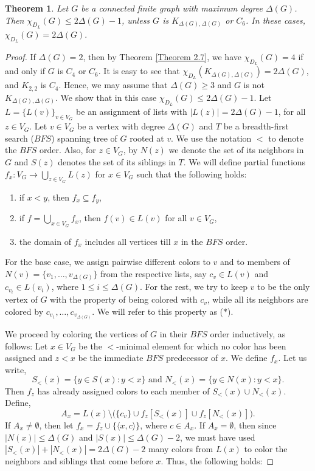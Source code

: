 \documentclass[12pt,reqno,a4paper]{amsart}
\theoremstyle{definition}
\newtheorem{thm}[defn]{Theorem}
\begin{document}
\begin{thm}\label{Theorem 3.1}
{\em Let $G$ be a connected finite graph with maximum degree $\Delta(G)$. Then $\chi_{D_{L}}(G)\leq 2\Delta(G)-1$, unless $G$ is  $K_{\Delta(G),\Delta(G)}$ or $C_6$. In these cases, $\chi_{D_{L}}(G) = 2\Delta(G)$}.    
\end{thm}

\begin{proof}
   If $\Delta(G)=2$, then by Theorem \ref{Theorem 2.7}, we have $\chi_{D_L}(G) = 4$ if and only if $G$ is $C_4$ or $C_6$. It is easy to see that $\chi_{D_L}(K_{\Delta(G),\Delta(G)}) = 2\Delta(G)$, and $K_{2,2}$ is $C_4$. Hence, we may assume that $\Delta(G) \geq 3$ and $G$ is not $K_{\Delta(G),\Delta(G)}$. We show that in this case $\chi_{D_L}(G) \leq 2\Delta(G)-1$. Let $L=\{L(v)\}_{v\in V_G}$ be an assignment of lists with $|L(z)| = 2\Delta(G)-1$, for all $z\in V_G$. 
   Let $v\in V_G$ be a vertex with degree $\Delta(G)$ and $T$ be a breadth-first search ($BFS$) spanning tree of $G$ rooted at $v$. We use the notation $<$ to denote the $BFS$ order. Also, for $z\in V_{G}$, by $N(z)$ we denote the set of its neighbors in $G$ and $S(z)$ denotes the set of its siblings in $T$. We will define partial functions $f_x: V_{G} \to \bigcup_{z\in V_{G}}L(z)$ for $x\in V_{G}$ such that the following holds: 
\begin{enumerate}
    \item[(i)] if $x < y$, then $f_x\subseteq f_y$,
    \item[(ii)] if $f=\bigcup_{x\in V_{G}} f_x$, then $f(v)\in L(v)$ for all $v\in V_{G}$,
    
    \item[(iii)] the domain of $f_{x}$ includes all vertices till $x$ in the $BFS$ order.
\end{enumerate}
For the base case, we assign pairwise different colors to $v$ and to members of $N(v) = \{v_1,\dots, v_{\Delta(G)}\}$ from the respective lists, say $c_v\in L(v)$ and $c_{v_i}\in L(v_i)$, where $1\leq i\leq \Delta(G)$. 
For the rest, we try to keep $v$ to be the only vertex of $G$ with the property of being colored with $c_v$, while all its neighbors are colored by $c_{v_1},\dots, c_{v_{\Delta(G)}}$. We will refer to this property as ($\ast$). 

We proceed by coloring the vertices of $G$ in their $BFS$ order inductively, as follows: Let $x\in V_{G}$ be the $<$-minimal element for which no color has been assigned and $z<x$ be the immediate $BFS$ predecessor of $x$. We define $f_x$. Let us write,
$$
    S_<(x) = \{y\in S(x): y<x\} \text{ and } N_<(x) = \{y\in N(x): y<x\}.
$$
Then $f_z$ has already assigned colors to each member of $S_<(x) \cup N_<(x)$. Define,
$$
A_x= L(x)\setminus \Big(\{c_v\} \cup f_z[S_<(x)] \cup f_z[N_<(x)]\Big).
$$
If $A_{x} \neq \emptyset$, then let $f_x = f_z \cup \{\langle x, c \rangle\} $,
where $c\in A_x$. If $A_x=\emptyset$, then since $|N(x)| \leq \Delta(G)$ and $|S(x)|\leq \Delta(G)-2$, we must have used $|S_<(x)| + |N_<(x)| = 2\Delta(G) -2$ many colors from $L(x)$ to color the neighbors and siblings that come before $x$. Thus, the following holds: 


\end{proof}
\end{document}
